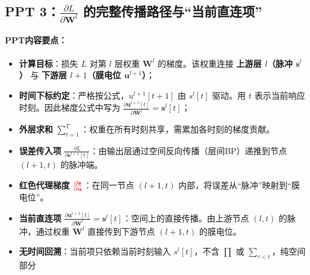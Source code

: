 \documentclass[journal,12pt,onecolumn]{IEEEtran}
\begin{document}
\subsection*{PPT 3：$\frac{\partial L}{\partial \mathbf{W}^l}$ 的完整传播路径与“当前直连项”}

\paragraph{\textbf{PPT内容要点：}}
\begin{itemize}
    \item \textbf{计算目标}：损失 \(L\) 对第 \(l\) 层权重 \(\mathbf{W}^l\) 的梯度。该权重连接 \textbf{上游层 \(l\)（脉冲 \(\mathbf{s}^l\)）} 与 \textbf{下游层 \(l+1\)（膜电位 \(\mathbf{u}^{l+1}\)）}；
    \item \textbf{时间下标约定}：严格按公式，\(u^{l+1}[t+1]\) 由 \(s^l[t]\) 驱动。用 \(t\) 表示当前响应时刻。因此梯度公式中写为 \(\frac{\partial \mathbf{u}^{l+1}[t]}{\partial \mathbf{W}^l} = \mathbf{s}^{l}[t]\)；
    \item \textbf{外层求和} \(\sum_{t=1}^T\)：权重在所有时刻共享，需累加各时刻的梯度贡献。
    \item \textbf{误差传入项} \(\frac{\partial L}{\partial \mathbf{s}^{l+1}[t]}\)：由输出层通过空间反向传播（层间BP）递推到节点 \((l+1, t)\) 的脉冲端。
    \item \textbf{红色代理梯度} \({\color{red}{\frac{\partial \mathbf{s}}{\partial \mathbf{u}}}}\)：在同一节点 \((l+1, t)\) 内部，将误差从“脉冲”映射到“膜电位”。
    \item \textbf{当前直连项} \(\frac{\partial \mathbf{u}^{l+1}[t]}{\partial \mathbf{W}^l} = \mathbf{s}^{l}[t]\)：空间上的直接传播。由上游节点 \((l, t)\) 的脉冲，通过权重 \(\mathbf{W}^l\) 直接传到下游节点 \((l+1, t)\) 的膜电位。
    \item \textbf{无时间回溯}：当前项只依赖当前时刻输入 \(s^l[t]\)，不含 \(\prod\) 或 \(\sum_{\tau < t}\)，纯空间部分
\end{itemize}
\end{document}
